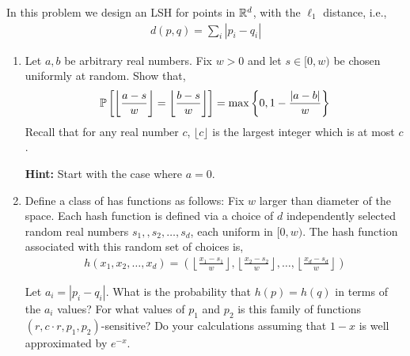 \documentclass[10pt]{article}
\begin{document}
\FloatBarrier
\begin{problem}[Problem 2]
In this problem we design an LSH for points in \( \mathbb{R}^d \), with the \( \ell_1 \) distance, i.e.,
\begin{align*}
    d(p,q) = \sum_{i}^{} |p_i-q_i|
\end{align*}
\begin{enumerate}[label=(\alph*),nolistsep]
    \item Let \( a,b \) be arbitrary real numbers. Fix \( w>0 \) and let \( s\in[0,w) \) be chosen uniformly at random. Show that,
        \begin{align*}
            \mathbb{P} \left[ \left\lfloor \frac{a-s}{w} \right\rfloor = \left\lfloor \frac{b-s}{w}  \right\rfloor \right] = \max \left\{ 0, 1 - \frac{|a-b|}{w}  \right\}
        \end{align*}
    Recall that for any real number \( c \), \( \lfloor c \rfloor \) is the largest integer which is at most \( c \).
    
        \textbf{Hint:} Start with the case where \( a=0 \).
    
    \item Define a class of has functions as follows: Fix \( w \) larger than diameter of the space. Each hash function is defined via a choice of \( d \) independently selected random real numbers \( s_1,,s_2,\ldots, s_d \), each uniform in \( [0,w) \). The hash function associated with this random set of choices is,
        \begin{align*}
            h(x_1,x_2,\ldots, x_d) = \left( \left\lfloor \frac{x_1-s_1}{w}  \right\rfloor, \left\lfloor \frac{x_2-s_2}{w}  \right\rfloor, \ldots, \left\lfloor \frac{x_d-s_d}{w}  \right\rfloor  \right)
        \end{align*}
        
        Let \( a_i = |p_i-q_i| \). What is the probability that \( h(p) = h(q) \) in terms of the \( a_i \) values? For what values of \(  p_1 \) and \( p_2 \) is this family of functions \( (r,c\cdot r, p_1,p_2) \)-sensitive? Do your calculations assuming that \( 1-x \) is well approximated by \( e^{-x} \).
\end{enumerate}
\end{problem}
\end{document}

